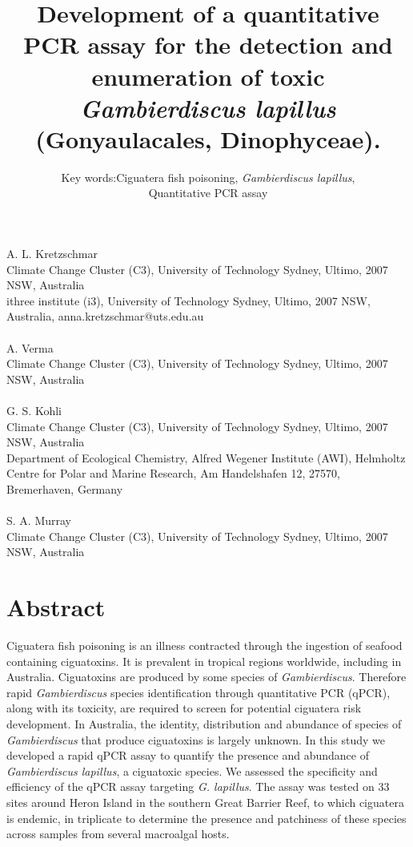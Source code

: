 \documentclass[12pt]{article}
\title{Development of a quantitative PCR assay for the detection and enumeration of toxic \emph{Gambierdiscus lapillus} (Gonyaulacales, Dinophyceae).} %
\author{Key words:Ciguatera fish poisoning, \emph{Gambierdiscus lapillus},\\
 Quantitative PCR assay}%
\date{}
\begin{document}
\maketitle
\paragraph{}A. L. Kretzschmar\\
Climate Change Cluster (C3), University of Technology Sydney, Ultimo, 2007 NSW, Australia\\
ithree institute (i3), University of Technology Sydney, Ultimo, 2007 NSW, Australia, anna.kretzschmar@uts.edu.au
\paragraph{}A. Verma \\
Climate Change Cluster (C3), University of Technology Sydney, Ultimo, 2007 NSW, Australia
\paragraph{}G. S. Kohli\\
Climate Change Cluster (C3), University of Technology Sydney, Ultimo, 2007 NSW, Australia\\
Department of Ecological Chemistry, Alfred Wegener Institute (AWI), Helmholtz Centre for Polar and Marine Research, Am Handelshafen 12, 27570, Bremerhaven, Germany
\paragraph{}S. A. Murray\\
Climate Change Cluster (C3), University of Technology Sydney, Ultimo, 2007 NSW, Australia
\newpage
\section*{Abstract}
Ciguatera fish poisoning is an illness contracted through the ingestion of seafood containing ciguatoxins. 
It is prevalent in tropical regions worldwide, including in Australia. 
Ciguatoxins are produced by some species of \emph{Gambierdiscus}. 
Therefore rapid \emph{Gambierdiscus} species identification through quantitative PCR (qPCR), along with its toxicity, are required to screen for potential ciguatera risk development. 
In Australia, the identity, distribution and abundance of species of \textit{Gambierdiscus} that produce ciguatoxins is largely unknown. 
In this study we developed a rapid qPCR assay to quantify the presence and abundance of \textit{Gambierdiscus lapillus}, a ciguatoxic species. %
We assessed the specificity and efficiency of the  qPCR assay targeting \textit{G. lapillus}. %
The assay was tested on 33 sites around Heron Island in the southern Great Barrier Reef, to which ciguatera is endemic, in triplicate to determine the presence and patchiness of these species across samples from several macroalgal hosts.  
\end{document}
